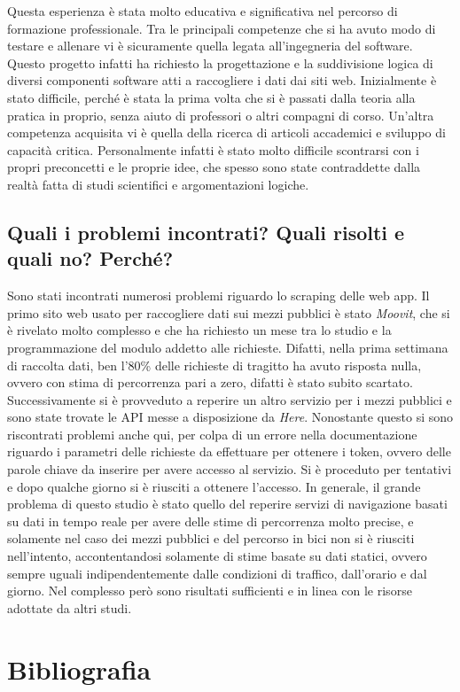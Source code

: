 \documentclass[a4paper,11pt]{article}
\begin{document}
Questa esperienza è stata molto educativa e significativa nel percorso di formazione professionale. Tra le principali competenze che si ha avuto modo di testare e allenare vi è sicuramente quella legata all'ingegneria del software. Questo progetto infatti ha richiesto la progettazione e la suddivisione logica di diversi componenti software atti a raccogliere i dati dai siti web. Inizialmente è stato difficile, perché è stata la prima volta che si è passati dalla teoria alla pratica in proprio, senza aiuto di professori o altri compagni di corso. Un'altra competenza acquisita vi è quella della ricerca di articoli accademici e sviluppo di capacità critica. Personalmente infatti è stato molto difficile scontrarsi con i propri preconcetti e le proprie idee, che spesso sono state contraddette dalla realtà fatta di studi scientifici e argomentazioni logiche.

\subsection{Quali i problemi incontrati? Quali risolti e quali no? Perché?}

Sono stati incontrati numerosi problemi riguardo lo scraping delle web app. Il primo sito web usato per raccogliere dati sui mezzi pubblici è stato \textit{Moovit}, che si è rivelato molto complesso e che ha richiesto un mese tra lo studio e la programmazione del modulo addetto alle richieste. Difatti, nella prima settimana di raccolta dati, ben l'80\% delle richieste di tragitto ha avuto risposta nulla, ovvero con stima di percorrenza pari a zero, difatti è stato subito scartato. Successivamente si è provveduto a reperire un altro servizio per i mezzi pubblici e sono state trovate le API messe a disposizione da \textit{Here}. Nonostante questo si sono riscontrati problemi anche qui, per colpa di un errore nella documentazione riguardo i parametri delle richieste da effettuare per ottenere i token, ovvero delle parole chiave da inserire per avere accesso al servizio. Si è proceduto per tentativi e dopo qualche giorno si è riusciti a ottenere l'accesso. In generale, il grande problema di questo studio è stato quello del reperire servizi di navigazione basati su dati in tempo reale per avere delle stime di percorrenza molto precise, e solamente nel caso dei mezzi pubblici e del percorso in bici non si è riusciti nell'intento, accontentandosi solamente di stime basate su dati statici, ovvero sempre uguali indipendentemente dalle condizioni di traffico, dall'orario e dal giorno. Nel complesso però sono risultati sufficienti e in linea con le risorse adottate da altri studi.

\section{Bibliografia}
\cite{isfortaudimob}
\cite{ellison2011travel}
\cite{faghih2017hail}
\cite{pagani2017knowledge}
\cite{chien2003dynamic}



\end{document}
